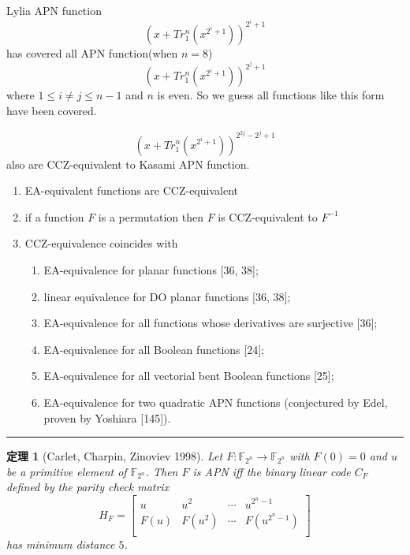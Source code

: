 \documentclass[12pt,a4paper]{ctexbook}
\newcommand{\0}{\textbf{0}}
\newcommand{\1}{\textbf{1}}
\newcommand{\F}{\mathbb{F}}
\newtheorem{theorem}{定理}
\begin{document}
    Lylia APN function\cite{Budaghyan2005}
    \[\left(x+Tr^n_1\left(x^{2^i+1}\right)\right)^{2^i+1}\]
    has covered all APN function(when $ n=8 $)
    \[\left(x+Tr^n_1\left(x^{2^i+1}\right)\right)^{2^j+1}\]
    where $ 1\leq i\neq j\leq n-1 $ and $ n $ is even.
    So we guess all functions like this form have been covered.
    
    
    \[\left(x+Tr^n_1\left(x^{2^i+1}\right)\right)^{2^{2j}-2^j+1}\]
    also are CCZ-equivalent to Kasami APN function.

    
    \begin{enumerate}
        \item EA-equivalent functions are CCZ-equivalent
        \item if a function $F$ is a permutation then $F$ is CCZ-equivalent to $F^{-1}$\cite{carlet1998codes}
        \item CCZ-equivalence coincides with\begin{enumerate}
            \item EA-equivalence for planar functions [36, 38];
            \item linear equivalence for DO planar functions [36, 38];
            \item EA-equivalence for all functions whose derivatives are surjective [36];
            \item EA-equivalence for all Boolean functions [24];
            \item EA-equivalence for all vectorial bent Boolean functions [25];
            \item EA-equivalence for two quadratic APN functions (conjectured by Edel,
            proven by Yoshiara [145]).
        \end{enumerate}
    \end{enumerate}
    \noindent\rule{\linewidth}{0.4pt}

    \begin{theorem}[Carlet, Charpin, Zinoviev 1998]
        Let $ F:\F_{2^n}\rightarrow\F_{2^n} $ with $ F(0)=0 $ and $ u $ be a primitive element of 
        $ \F_{2^n} $. Then $ F $ is APN iff the binary linear code $ C_F $ defined by the 
        parity check matrix
        \[H_F=\begin{bmatrix}
            u&u^2&\cdots&u^{2^n-1}\\
            F(u)&F(u^2)&\cdots&F(u^{2^n-1})\\
        \end{bmatrix}\]
        has minimum distance $ 5 $.
    \end{theorem}
\end{document}
